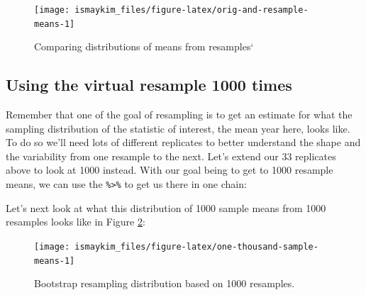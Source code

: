 \documentclass[12pt, krantz2,]{krantz}
\makeatletter
\newenvironment{Shaded}{\begin{snugshade}}{\end{snugshade}}
\newcommand{\DataTypeTok}[1]{\textcolor[rgb]{0.27,0.27,0.27}{#1}}
\newcommand{\DecValTok}[1]{\textcolor[rgb]{0.06,0.06,0.06}{#1}}
\newcommand{\KeywordTok}[1]{\textcolor[rgb]{0.27,0.27,0.27}{\textbf{#1}}}
\newcommand{\NormalTok}[1]{#1}
\newcommand{\OperatorTok}[1]{\textcolor[rgb]{0.43,0.43,0.43}{\textbf{#1}}}
\newcommand{\OtherTok}[1]{\textcolor[rgb]{0.37,0.37,0.37}{#1}}
\newcommand{\StringTok}[1]{\textcolor[rgb]{0.5,0.5,0.5}{#1}}
\newenvironment{kframe}{%
\medskip{}
\setlength{\fboxsep}{.8em}
 \def\at@end@of@kframe{}%
 \ifinner\ifhmode%
  \def\at@end@of@kframe{\end{minipage}}%
  \begin{minipage}{\columnwidth}%
 \fi\fi%
 \def\FrameCommand##1{\hskip\@totalleftmargin \hskip-\fboxsep
 \colorbox{shadecolor}{##1}\hskip-\fboxsep
     \hskip-\linewidth \hskip-\@totalleftmargin \hskip\columnwidth}%
 \MakeFramed {\advance\hsize-\width
   \@totalleftmargin\z@ \linewidth\hsize
   \@setminipage}}%
 {\par\unskip\endMakeFramed%
 \at@end@of@kframe}
\renewenvironment{Shaded}{\begin{kframe}}{\end{kframe}}
\makeatother
\begin{document}
\begin{figure}

{\centering \texttt{[image: ismaykim\_files/figure-latex/orig-and-resample-means-1]} 

}

\caption{Comparing distributions of means from resamples`}\label{fig:orig-and-resample-means}
\end{figure}

\hypertarget{using-the-virtual-resample-1000-times}{%
\subsection{Using the virtual resample 1000 times}\label{using-the-virtual-resample-1000-times}}

Remember that one of the goal of resampling is to get an estimate for what the sampling distribution of the statistic of interest, the mean year here, looks like. To do so we'll need lots of different replicates to better understand the shape and the variability from one resample to the next. Let's extend our 33 replicates above to look at 1000 instead. With our goal being to get to 1000 resample means, we can use the \texttt{\%\textgreater{}\%} to get us there in one chain:

\begin{Shaded}
\end{Shaded}

Let's next look at what this distribution of 1000 sample means from 1000 resamples looks like in Figure \ref{fig:one-thousand-sample-means}:

\begin{figure}

{\centering \texttt{[image: ismaykim\_files/figure-latex/one-thousand-sample-means-1]} 

}

\caption{Bootstrap resampling distribution based on 1000 resamples.}\label{fig:one-thousand-sample-means}
\end{figure}
\end{document}
